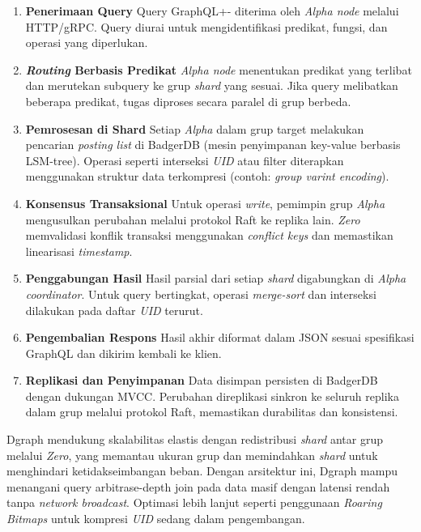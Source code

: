 \begin{enumerate}
	\item \textbf{Penerimaan Query} \newline
	      Query GraphQL+- diterima oleh \textit{Alpha node} melalui HTTP/gRPC. Query diurai untuk mengidentifikasi predikat, fungsi, dan operasi yang diperlukan.

	\item \textbf{\textit{Routing} Berbasis Predikat} \newline
	      \textit{Alpha node} menentukan predikat yang terlibat dan merutekan subquery ke grup \textit{shard} yang sesuai. Jika query melibatkan beberapa predikat, tugas diproses secara paralel di grup berbeda.

	\item \textbf{Pemrosesan di Shard} \newline
	      Setiap \textit{Alpha} dalam grup target melakukan pencarian \textit{posting list} di BadgerDB (mesin penyimpanan key-value berbasis LSM-tree). Operasi seperti interseksi \textit{UID} atau filter diterapkan menggunakan struktur data terkompresi (contoh: \textit{group varint encoding}).

	\item \textbf{Konsensus Transaksional} \newline
	      Untuk operasi \textit{write}, pemimpin grup \textit{Alpha} mengusulkan perubahan melalui protokol Raft ke replika lain. \textit{Zero} memvalidasi konflik transaksi menggunakan \textit{conflict keys} dan memastikan linearisasi \textit{timestamp}.

	\item \textbf{Penggabungan Hasil} \newline
	      Hasil parsial dari setiap \textit{shard} digabungkan di \textit{Alpha coordinator}. Untuk query bertingkat, operasi \textit{merge-sort} dan interseksi dilakukan pada daftar \textit{UID} terurut.

	\item \textbf{Pengembalian Respons} \newline
	      Hasil akhir diformat dalam JSON sesuai spesifikasi GraphQL dan dikirim kembali ke klien.

	\item \textbf{Replikasi dan Penyimpanan} \newline
	      Data disimpan persisten di BadgerDB dengan dukungan MVCC. Perubahan direplikasi sinkron ke seluruh replika dalam grup melalui protokol Raft, memastikan durabilitas dan konsistensi.
\end{enumerate}

Dgraph mendukung skalabilitas elastis dengan redistribusi \textit{shard} antar grup melalui \textit{Zero}, yang memantau ukuran grup dan memindahkan \textit{shard} untuk menghindari ketidakseimbangan beban. Dengan arsitektur ini, Dgraph mampu menangani query arbitrase-depth join pada data masif dengan latensi rendah tanpa \textit{network broadcast}. Optimasi lebih lanjut seperti penggunaan \textit{Roaring Bitmaps} untuk kompresi \textit{UID} sedang dalam pengembangan.